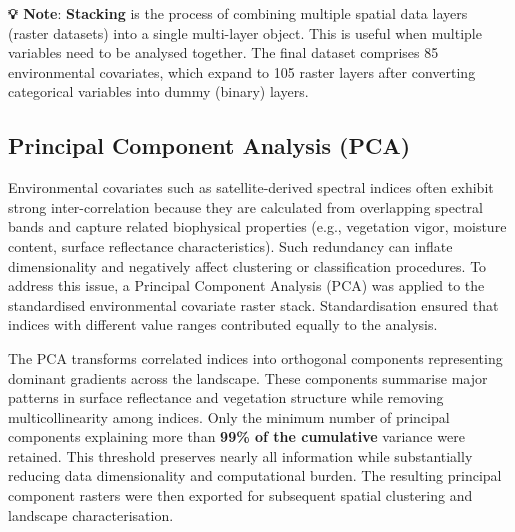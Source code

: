 \documentclass[
  10pt,
  b5paper,
  oneside]{book}
\begin{document}
\textbf{💡 Note}: \textbf{Stacking} is the process of combining multiple spatial data layers (raster datasets) into a single multi-layer object. This is useful when multiple variables need to be analysed together. The final dataset comprises 85 environmental covariates, which expand to 105 raster layers after converting categorical variables into dummy (binary) layers.

\subsection{Principal Component Analysis (PCA)}\label{pca}

Environmental covariates such as satellite-derived spectral indices often exhibit strong inter-correlation because they are calculated from overlapping spectral bands and capture related biophysical properties (e.g., vegetation vigor, moisture content, surface reflectance characteristics). Such redundancy can inflate dimensionality and negatively affect clustering or classification procedures. To address this issue, a Principal Component Analysis (PCA) was applied to the standardised environmental covariate raster stack. Standardisation ensured that indices with different value ranges contributed equally to the analysis.

The PCA transforms correlated indices into orthogonal components representing dominant gradients across the landscape. These components summarise major patterns in surface reflectance and vegetation structure while removing multicollinearity among indices. Only the minimum number of principal components explaining more than \textbf{99\% of the cumulative} variance were retained. This threshold preserves nearly all information while substantially reducing data dimensionality and computational burden. The resulting principal component rasters were then exported for subsequent spatial clustering and landscape characterisation.
\end{document}
